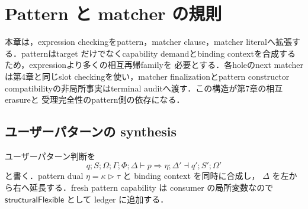 \section{Pattern と matcher の規則}

本章は，expression checkingをpattern，matcher clause，matcher literalへ拡張する．patternはtarget
だけでなくcapability demandとbinding contextを合成するため，expressionより多くの相互再帰familyを
必要とする．各holeのnext matcherは第4章と同じslot checkingを使い，matcher finalizationとpattern
constructor compatibilityの非局所事実はterminal auditへ渡す．この構造が第7章の相互erasureと
受理完全性のpattern側の依存になる．

\subsection{ユーザーパターンの synthesis}

ユーザーパターン判断を
\[
q;S;\Omega;\Gamma;\Phi;\Delta\vdash p\Rightarrow
  \eta;\Delta'\dashv q';S';\Omega'
\]
と書く．pattern dual $\eta=\kappa\triangleright\tau$ と binding context を同時に合成し，
$\Delta$ を左から右へ延長する．fresh pattern capability は consumer の局所変数なので
$\mathsf{structuralFlexible}$ として ledger に追加する．
\begin{mathpar}



\end{mathpar}

